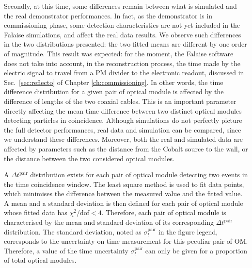 Secondly, at this time, some differences remain between what is simulated and the real demonstrator performances.
In fact, as the demonstrator is in commissioning phase, some detection characteristics are not yet included in the Falaise simulations, and affect the real data results.
We observe such differences in the two distributions presented: the two fitted means are different by one order of magnitude.
This result was expected: for the moment, the Falaise software does not take into account, in the reconstruction process, the time made by the electric signal to travel from a PM divider to the electronic readout, discussed in Sec.~\ref{sec:reflecto} of Chapter \ref{ch:commissioning}.
In other words, the time difference distribution for a given pair of optical module is affected by the difference of lengths of the two coaxial cables.
This is an important parameter directly affecting the mean time difference between two distinct optical modules detecting particles in coincidence.
Although simulations do not perfectly picture the full detector performances, real data and simulation can be compared, since we understand these differences.
Moreover, both the real and simulated data are affected by parameters such as the distance from the Cobalt source to the wall, or the distance between the two considered optical modules.

A $\Delta t^{\text{pair}}$ distribution exists for each pair of optical module detecting two events in the time coincidence window.
The least square method is used to fit data points, which minimises the difference between the measured value and the fitted value.
A mean and a standard deviation is then defined for each pair of optical module whose fitted data has $\chi^{2}/\text{dof}<4$.
Therefore, each pair of optical module is characterised by the mean and standard deviation of its corresponding $\Delta t^{\text{pair}}$ distribution.
The standard deviation, noted as $\sigma_{t}^{\text{pair}}$ in the figure legend, corresponds to the uncertainty on time measurement for this peculiar pair of OM.
Therefore, a value of the time uncertainty $\sigma_{t}^{\text{pair}}$ can only be given for a proportion of total optical modules.

